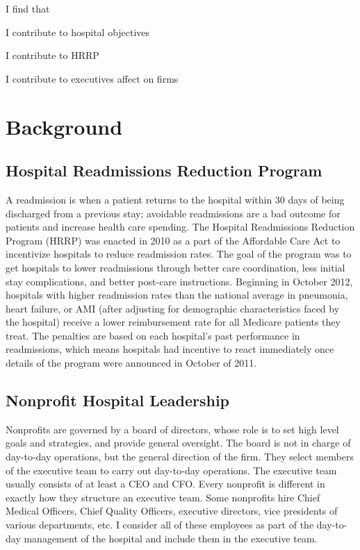 \documentclass[12pt]{article}
\begin{document}
    I find that

    I contribute to hospital objectives

    I contribute to HRRP

    I contribute to executives affect on firms

    

    \section{Background}

    \subsection{Hospital Readmissions Reduction Program}

    A readmission is when a patient returns to the hospital within 30 days of being discharged from a previous stay; avoidable readmissions are a bad outcome for patients and increase health care spending. The Hospital Readmissions Reduction Program (HRRP) was enacted in 2010 as a part of the Affordable Care Act to incentivize hospitals to reduce readmission rates. The goal of the program was to get hospitals to lower readmissions through better care coordination, less initial stay complications, and better post-care instructions. Beginning in October 2012, hospitals with higher readmission rates than the national average in pneumonia, heart failure, or AMI (after adjusting for demographic characteristics faced by the hospital) receive a lower reimbursement rate for all Medicare patients they treat. The penalties are based on each hospital's past performance in readmissions, which means hospitals had incentive to react immediately once details of the program were announced in October of 2011. 

    \subsection{Nonprofit Hospital Leadership}

    Nonprofits are governed by a board of directors, whose role is to set high level goals and strategies, and provide general oversight. The board is not in charge of day-to-day operations, but the general direction of the firm. They select members of the executive team to carry out day-to-day operations. The executive team usually consists of at least a CEO and CFO. Every nonprofit is different in exactly how they structure an executive team. Some nonprofits hire Chief Medical Officers, Chief Quality Officers, executive directors, vice presidents of various departments, etc. I consider all of these employees as part of the day-to-day management of the hospital and include them in the executive team. 
\end{document}
